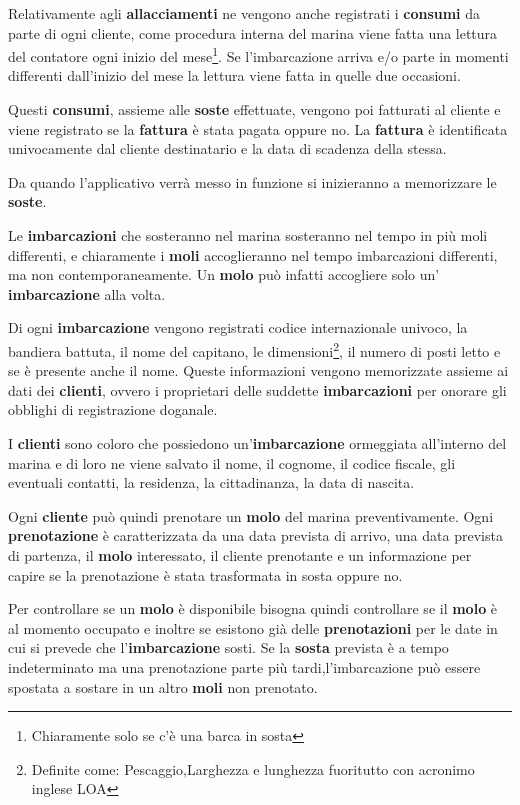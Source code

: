 Relativamente agli \textbf{allacciamenti} ne vengono anche registrati i \textbf{consumi} da parte di ogni cliente, come procedura interna del marina viene fatta una lettura del contatore ogni inizio del mese\footnote{Chiaramente solo se c'è una barca in sosta}. Se l'imbarcazione arriva e/o parte in momenti differenti dall'inizio del mese la lettura viene fatta in quelle due occasioni.

Questi \textbf{consumi}, assieme alle \textbf{soste} effettuate, vengono poi fatturati al cliente e viene registrato se la \textbf{fattura} è stata pagata oppure no.
La \textbf{fattura} è identificata univocamente dal cliente destinatario e la data di scadenza della stessa.

Da quando l'applicativo verrà messo in funzione si inizieranno a memorizzare le \textbf{soste}.

Le \textbf{imbarcazioni} che sosteranno nel marina sosteranno nel tempo in più moli differenti, e chiaramente i \textbf{moli} accoglieranno nel tempo imbarcazioni differenti, ma non contemporaneamente. Un \textbf{molo} può infatti accogliere solo un' \textbf{imbarcazione} alla volta.

Di ogni \textbf{imbarcazione} vengono registrati codice internazionale univoco, la bandiera battuta, il nome del capitano, le dimensioni\footnote{Definite come: Pescaggio,Larghezza e lunghezza fuoritutto con acronimo inglese LOA}, il numero di posti letto e se è presente anche il nome. Queste informazioni vengono memorizzate assieme ai dati dei \textbf{clienti}, ovvero i proprietari delle suddette \textbf{imbarcazioni} per onorare gli obblighi di registrazione doganale.

I \textbf{clienti} sono coloro che possiedono un'\textbf{imbarcazione} ormeggiata all'interno del marina e di loro ne viene salvato il nome, il cognome, il codice fiscale, gli eventuali contatti, la residenza, la cittadinanza, la data di nascita.

Ogni \textbf{cliente} può quindi prenotare un \textbf{molo} del marina preventivamente. Ogni \textbf{prenotazione} è caratterizzata da una data prevista di arrivo, una data prevista di partenza, il \textbf{molo} interessato, il cliente prenotante e un informazione per capire se la prenotazione è stata trasformata in sosta oppure no.

Per controllare se un \textbf{molo} è disponibile bisogna quindi controllare se il \textbf{molo} è al momento occupato e inoltre se esistono già delle \textbf{prenotazioni} per le date in cui si prevede che l'\textbf{imbarcazione} sosti. Se la \textbf{sosta} prevista è a tempo indeterminato ma una prenotazione parte più tardi,l'imbarcazione può essere spostata a sostare in un altro \textbf{moli} non prenotato.


